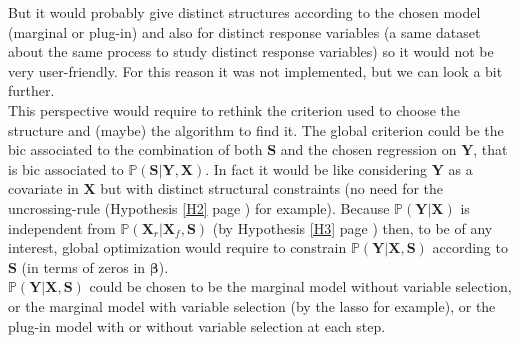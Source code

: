 \documentclass[12pt,a4paper]{report}
\begin{document}
			 But it would probably give distinct structures according to the chosen model (marginal or plug-in) and also for distinct response variables (a same dataset about the same process to study distinct response variables) so it would not be very user-friendly. For this reason it was not implemented, but we can look a bit further.\\
			 
			 This perspective would require to rethink the criterion used to choose the structure and (maybe) the algorithm to find it. The global criterion could be the {\sc bic} associated to the combination of both $\boldsymbol{S}$ and the chosen regression on $\boldsymbol{Y}$, that is {\sc bic} associated to $\mathbb{P}(\boldsymbol{S}|\boldsymbol{Y},\boldsymbol{X})$. In fact it would be like considering $\boldsymbol{Y}$ as a covariate in $\boldsymbol{X}$ but with distinct structural constraints (no need for the uncrossing-rule (Hypothesis \ref{H2} page \pageref{H2}) for example).  %
			 Because $\mathbb{P}(\boldsymbol{Y}|\boldsymbol{X})$ is independent from $\mathbb{P}(\boldsymbol{X}_r|\boldsymbol{X}_f,\boldsymbol{S})$ (by Hypothesis \ref{H3} page \pageref{H3})
			then, to be of any interest, global optimization would require to constrain $\mathbb{P}(\boldsymbol{Y}|\boldsymbol{X},\boldsymbol{S})$ according to $\boldsymbol{S}$ (in terms of zeros in $\boldsymbol{\beta}$).\\
			$\mathbb{P}(\boldsymbol{Y}|\boldsymbol{X},\boldsymbol{S})$ could be chosen to be the marginal model without variable selection, or the marginal model with variable selection (by the {\sc lasso} for example), or the plug-in model with or without variable selection at each step.
			
\end{document}
